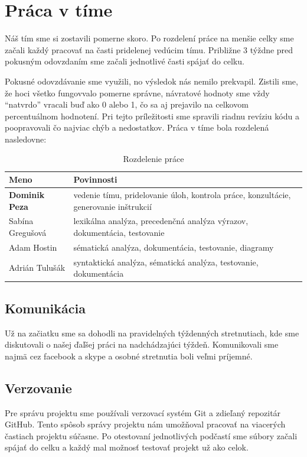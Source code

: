 \documentclass [11pt, a4paper]{article}
\begin{document}
\section{Práca v tíme}
Náš tím sme si zostavili pomerne skoro. Po rozdelení práce na menšie celky sme začali každý pracovať na časti pridelenej vedúcim tímu. Približne 3 týždne pred pokusným odovzdaním sme začali jednotlivé časti spájať do celku. 

Pokusné odovzdávanie sme využili, no výsledok nás nemilo prekvapil. Zistili sme, že hoci všetko fungovvalo pomerne správne, návratové hodnoty sme vždy ``natvrdo'' vracali buď ako 0 alebo 1, čo sa aj prejavilo na celkovom percentuálnom hodnotení. Pri tejto príležitosti sme spravili riadnu revíziu kódu a poopravovali čo najviac chýb a nedostatkov. Práca v tíme bola rozdelená nasledovne:

\begin{table}[H]
\centering
\begin{tabular}{|l|l|}
\hline
Meno & Povinnosti\\ \hline
\textbf{Dominik Peza} & vedenie tímu, pridelovanie úloh, kontrola práce, konzultácie, generovanie inštrukcií\\
Sabína Gregušová & lexikálna analýza, precedenčná analýza výrazov, dokumentácia, testovanie\\
Adam Hostin & sématická analýza, dokumentácia, testovanie, diagramy\\
Adrián Tulušák & syntaktická analýza, sématická analýza, testovanie, dokumentácia\\
\hline
\end{tabular}
\caption{Rozdelenie práce}
\end{table}

\subsection{Komunikácia}
Už na začiatku sme sa dohodli na pravidelných týždenných stretnutiach, kde sme diskutovali o našej ďaľšej práci na nadchádzajúci týždeň. Komunikovali sme najmä cez facebook a skype a osobné stretnutia boli veľmi príjemné. 

\subsection{Verzovanie}
Pre správu projektu sme používali verzovací systém Git a zdieľaný repozitár GitHub. Tento spôsob správy projektu nám umožňoval pracovať na viacerých častiach projektu súčasne. Po otestovaní jednotlivých podčastí sme súbory začali spájať do celku a každý mal možnosť testovať projekt už ako celok.
\end{document}
